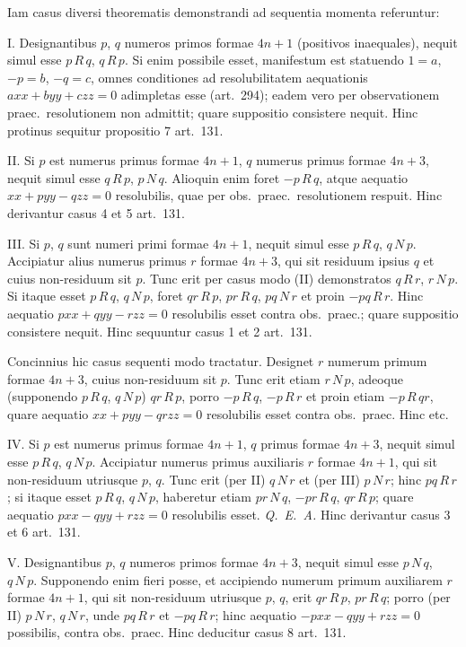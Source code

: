 \documentclass[12pt,a4paper]{article}
\theoremstyle{plain}
\theoremstyle{definition}
\theoremstyle{remark}
\begin{document}
Iam casus diversi theorematis demonstrandi ad sequentia momenta referuntur:

\textsc{I.} Designantibus $p$, $q$ numeros primos formae $4n+1$ (positivos inaequales), nequit simul esse $p \, R \, q$, $q \, R \, p$. Si enim possibile esset, manifestum est statuendo $1 = a$, $-p = b$, $-q = c$, omnes conditiones ad resolubilitatem aequationis $axx + byy + czz = 0$ adimpletas esse (art.~294); eadem vero per observationem praec.~resolutionem non admittit; quare suppositio consistere nequit. Hinc protinus sequitur propositio 7 art.~131.

\textsc{II.} Si $p$ est numerus primus formae $4n+1$, $q$ numerus primus formae $4n+3$, nequit simul esse $q \, R \, p$, $p \, N \, q$. Alioquin enim foret $-p \, R \, q$, atque aequatio $xx + pyy - qzz = 0$ resolubilis, quae per obs.~praec.~resolutionem respuit. Hinc derivantur casus 4 et 5 art.~131.

\textsc{III.} Si $p$, $q$ sunt numeri primi formae $4n+1$, nequit simul esse $p \, R \, q$, $q \, N \, p$. Accipiatur alius numerus primus $r$ formae $4n+3$, qui sit residuum ipsius $q$ et cuius non-residuum sit $p$. Tunc erit per casus modo (II) demonstratos $q \, R \, r$, $r \, N \, p$. Si itaque esset $p \, R \, q$, $q \, N \, p$, foret $qr \, R \, p$, $pr \, R \, q$, $pq \, N \, r$ et proin $-pq \, R \, r$. Hinc aequatio $pxx + qyy - rzz = 0$ resolubilis esset contra obs.~praec.; quare suppositio consistere nequit. Hinc sequuntur casus 1 et 2 art.~131.

Concinnius hic casus sequenti modo tractatur. Designet $r$ numerum primum formae $4n+3$, cuius non-residuum sit $p$. Tunc erit etiam $r \, N \, p$, adeoque (supponendo $p \, R \, q$, $q \, N \, p$) $qr \, R \, p$, porro $-p \, R \, q$, $-p \, R \, r$ et proin etiam $-p \, R \, qr$, quare aequatio $xx + pyy - qrzz = 0$ resolubilis esset contra obs.~praec. Hinc etc.

\textsc{IV.} Si $p$ est numerus primus formae $4n+1$, $q$ primus formae $4n+3$, nequit simul esse $p \, R \, q$, $q \, N \, p$. Accipiatur numerus primus auxiliaris $r$ formae $4n+1$, qui sit non-residuum utriusque $p$, $q$. Tunc erit (per II) $q \, N \, r$ et (per III) $p \, N \, r$; hinc $pq \, R \, r$; si itaque esset $p \, R \, q$, $q \, N \, p$, haberetur etiam $pr \, N \, q$, $-pr \, R \, q$, $qr \, R \, p$; quare aequatio $pxx - qyy + rzz = 0$ resolubilis esset. \textit{Q.~E.~A.} Hinc derivantur casus 3 et 6 art.~131.

\textsc{V.} Designantibus $p$, $q$ numeros primos formae $4n+3$, nequit simul esse $p \, N \, q$, $q \, N \, p$. Supponendo enim fieri posse, et accipiendo numerum primum auxiliarem $r$ formae $4n+1$, qui sit non-residuum utriusque $p$, $q$, erit $qr \, R \, p$, $pr \, R \, q$; porro (per II) $p \, N \, r$, $q \, N \, r$, unde $pq \, R \, r$ et $-pq \, R \, r$; hinc aequatio $-pxx - qyy + rzz = 0$ possibilis, contra obs.~praec. Hinc deducitur casus 8 art.~131.
\end{document}
